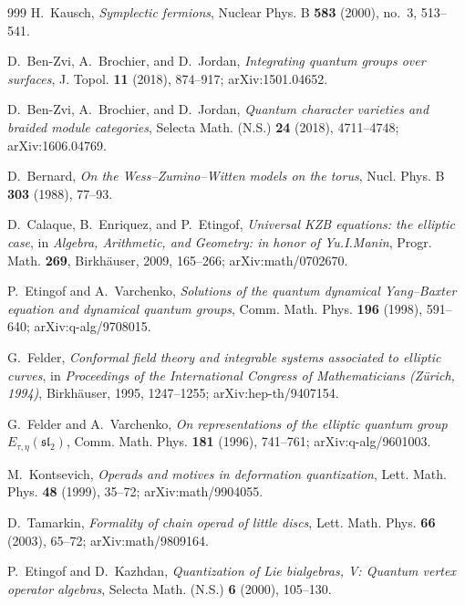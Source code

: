 \begin{thebibliography}{999}
H.~Kausch, \emph{Symplectic fermions}, Nuclear Phys. B \textbf{583} (2000), no.~3, 513--541.


D.~Ben-Zvi, A.~Brochier, and D.~Jordan, \emph{Integrating quantum groups over surfaces}, J. Topol. \textbf{11} (2018), 874--917; arXiv:1501.04652.

D.~Ben-Zvi, A.~Brochier, and D.~Jordan, \emph{Quantum character varieties and braided module categories}, Selecta Math. (N.S.) \textbf{24} (2018), 4711--4748; arXiv:1606.04769.

D.~Bernard, \emph{On the Wess--Zumino--Witten models on the torus}, Nucl. Phys. B \textbf{303} (1988), 77--93.

D.~Calaque, B.~Enriquez, and P.~Etingof, \emph{Universal KZB equations: the elliptic case}, in \emph{Algebra, Arithmetic, and Geometry: in honor of Yu.\@ I.\@ Manin}, Progr. Math. \textbf{269}, Birkh\"auser, 2009, 165--266; arXiv:math/0702670.

P.~Etingof and A.~Varchenko, \emph{Solutions of the quantum dynamical Yang--Baxter equation and dynamical quantum groups}, Comm. Math. Phys. \textbf{196} (1998), 591--640; arXiv:q-alg/9708015.

G.~Felder, \emph{Conformal field theory and integrable systems associated to elliptic curves}, in \emph{Proceedings of the International Congress of Mathematicians (Z\"urich, 1994)}, Birkh\"auser, 1995, 1247--1255; arXiv:hep-th/9407154.

G.~Felder and A.~Varchenko, \emph{On representations of the elliptic quantum group $E_{\tau,\eta}(\mathfrak{sl}_2)$}, Comm. Math. Phys. \textbf{181} (1996), 741--761; arXiv:q-alg/9601003.

M.~Kontsevich, \emph{Operads and motives in deformation quantization}, Lett. Math. Phys. \textbf{48} (1999), 35--72; arXiv:math/9904055.

D.~Tamarkin, \emph{Formality of chain operad of little discs}, Lett. Math. Phys. \textbf{66} (2003), 65--72; arXiv:math/9809164.

P.~Etingof and D.~Kazhdan, \emph{Quantization of Lie bialgebras, V: Quantum vertex operator algebras}, Selecta Math. (N.S.) \textbf{6} (2000), 105--130.



\end{thebibliography}
